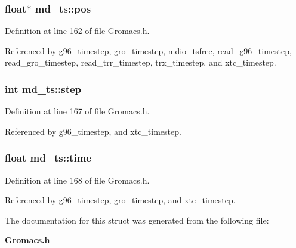 \subsubsection{\setlength{\rightskip}{0pt plus 5cm}float$\ast$ md\_\-ts::pos}\label{structmd__ts_m0}




Definition at line 162 of file Gromacs.h.

Referenced by g96\_\-timestep, gro\_\-timestep, mdio\_\-tsfree, read\_\-g96\_\-timestep, read\_\-gro\_\-timestep, read\_\-trr\_\-timestep, trx\_\-timestep, and xtc\_\-timestep.
\subsubsection{\setlength{\rightskip}{0pt plus 5cm}int md\_\-ts::step}\label{structmd__ts_m2}




Definition at line 167 of file Gromacs.h.

Referenced by g96\_\-timestep, and xtc\_\-timestep.
\subsubsection{\setlength{\rightskip}{0pt plus 5cm}float md\_\-ts::time}\label{structmd__ts_m3}




Definition at line 168 of file Gromacs.h.

Referenced by g96\_\-timestep, gro\_\-timestep, and xtc\_\-timestep.

The documentation for this struct was generated from the following file:\begin{CompactItemize}
\item 
{\bf Gromacs.h}\end{CompactItemize}
